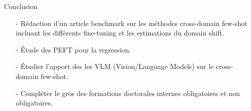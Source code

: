 \begin{subsectionframemod}{Conclusion}
\begin{itemize}
    \item[-]  Rédaction d'un article benchmark sur les méthodes cross-domain few-shot incluant les différents fine-tuning et les estimations du domain shift.
    \item[-]  Étude des PEFT pour la regression.
    \item[-]  Étudier l'apport des les VLM (Vision/Language Models) sur le cross-domain few-shot.
    \item[-]  Compléter le gros des formations doctorales internes obligatoires et non obligatoires.
\end{itemize}


\end{subsectionframemod}